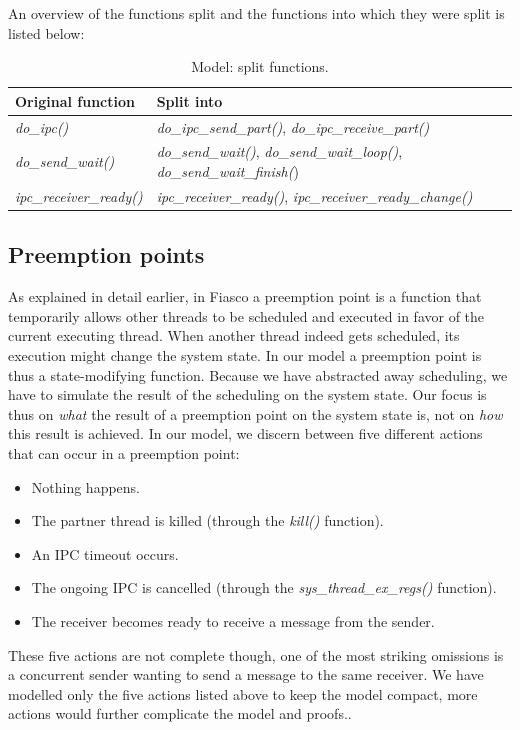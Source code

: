 An overview of the functions split and the functions into which they were split is listed below:

\begin{table}[!htc]
\begin{tabular}{ll}
\textbf{Original function} & \textbf{Split into} \\
\hline
\emph{do\_ipc()} & \emph{do\_ipc\_send\_part()}, \emph{do\_ipc\_receive\_part()} \\
\emph{do\_send\_wait()} & \emph{do\_send\_wait()}, \emph{do\_send\_wait\_loop()}, \emph{do\_send\_wait\_finish(}) \\
\emph{ipc\_receiver\_ready()} & \emph{ipc\_receiver\_ready()}, \emph{ipc\_receiver\_ready\_change()} \\
\hline
\end{tabular}
\caption{Model: split functions.}
\end{table}

\subsection{Preemption points}
As explained in detail earlier, in Fiasco a preemption point is a function that temporarily allows other threads to be scheduled and executed in favor of the current executing thread. When another thread indeed gets scheduled, its execution might change the system state. In our model a preemption point is thus a state-modifying function. Because we have abstracted away scheduling, we have to simulate the result of the scheduling on the system state. Our focus is thus on \textit{what} the result of a preemption point on the system state is, not on \textit{how} this result is achieved. In our model, we discern between five different actions that can occur in a preemption point:
\begin{itemize}	
 \item Nothing happens.
 \item The partner thread is killed (through the \emph{kill()} function).
 \item An IPC timeout occurs.
 \item The ongoing IPC is cancelled (through the \emph{sys\_thread\_ex\_regs()} function).
 \item The receiver becomes ready to receive a message from the sender.
\end{itemize}

These five actions are not complete though, one of the most striking omissions is a concurrent sender wanting to send a message to the same receiver. We have modelled only the five actions listed above to keep the model compact, more actions would further complicate the model and proofs.\emptyline.

